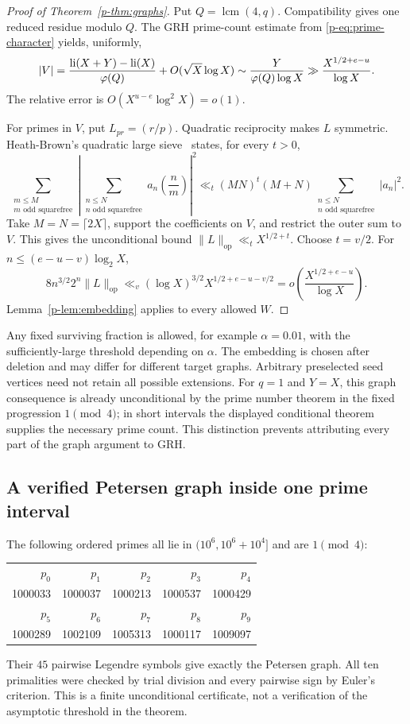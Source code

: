 \documentclass[11pt,a4paper]{article}
\theoremstyle{definition}
\theoremstyle{remark}
\begin{document}
\begin{proof}[Proof of Theorem~\ref{p-thm:graphs}]
Put $Q=\operatorname{lcm}(4,q)$. Compatibility gives one reduced residue modulo $Q$.
The GRH prime-count estimate from \eqref{p-eq:prime-character} yields,
uniformly,
\[
 |V|=\frac{\operatorname{li}(X+Y)-\operatorname{li}(X)}{\varphi(Q)}+O(\sqrt X\log X)
 \sim\frac{Y}{\varphi(Q)\log X}
 \gg\frac{X^{1/2+e-u}}{\log X}.
\]
The relative error is $O(X^{u-e}\log^2X)=o(1)$.

For primes in $V$, put $L_{pr}=(r/p)$. Quadratic reciprocity makes
$L$ symmetric. Heath-Brown's quadratic large sieve~\cite[Theorem 1]{p-HB}
states, for every $t>0$,
\[
 \sum_{\substack{m\le M\\m\text{ odd squarefree}}}
 \left|\sum_{\substack{n\le N\\n\text{ odd squarefree}}}
 a_n\left(\frac nm\right)\right|^2
 \ll_t (MN)^t(M+N)
       \sum_{\substack{n\le N\\n\text{ odd squarefree}}}|a_n|^2.
\]
Take $M=N=\lceil2X\rceil$, support the coefficients on $V$, and
restrict the outer sum to $V$. This gives the unconditional bound
$\|L\|_{\mathrm{op}}\ll_t X^{1/2+t}$.
Choose $t=v/2$. For $n\le(e-u-v)\log_2X$,
\[
 8n^{3/2}2^n\|L\|_{\mathrm{op}}
 \ll_v(\log X)^{3/2}X^{1/2+e-u-v/2}
 =o\!\left(\frac{X^{1/2+e-u}}{\log X}\right).
\]
Lemma~\ref{p-lem:embedding} applies to every allowed $W$.
\end{proof}

Any fixed surviving fraction is allowed, for example $\alpha=0.01$,
with the sufficiently-large threshold depending on $\alpha$. The
embedding is chosen after deletion and may differ for different target
graphs. Arbitrary preselected seed vertices need not retain all possible
extensions. For $q=1$ and $Y=X$, this graph consequence is already
unconditional by the prime number theorem in the fixed progression
$1\pmod4$; in short intervals the displayed conditional theorem supplies
the necessary prime count. This distinction prevents attributing every
part of the graph argument to GRH.

\subsection{A verified Petersen graph inside one prime interval}
The following ordered primes all lie in $(10^6,10^6+10^4]$ and are
$1\pmod4$:
\begin{center}
\begin{tabular}{rrrrr}
\toprule
$p_0$ & $p_1$ & $p_2$ & $p_3$ & $p_4$\\
1000033 & 1000037 & 1000213 & 1000537 & 1000429\\
\midrule
$p_5$ & $p_6$ & $p_7$ & $p_8$ & $p_9$\\
1000289 & 1002109 & 1005313 & 1000117 & 1009097\\
\bottomrule
\end{tabular}
\end{center}
Their $45$ pairwise Legendre symbols give exactly the Petersen graph.
All ten primalities were checked by trial division and every pairwise
sign by Euler's criterion. This is a finite unconditional certificate,
not a verification of the asymptotic threshold in the theorem.
\end{document}
